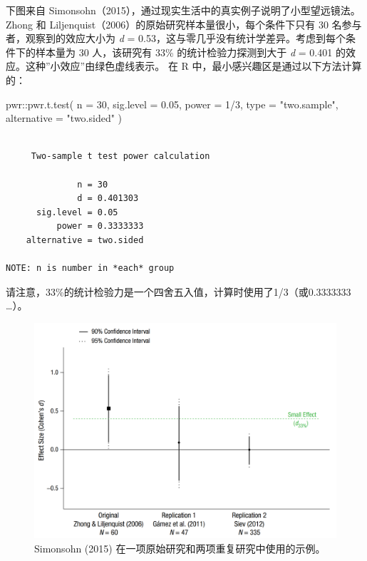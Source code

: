 \documentclass[
  letterpaper,
  DIV=11,
  numbers=noendperiod]{scrreprt}
\newenvironment{Shaded}{\begin{snugshade}}{\end{snugshade}}
\newcommand{\AttributeTok}[1]{\textcolor[rgb]{0.40,0.45,0.13}{#1}}
\newcommand{\DecValTok}[1]{\textcolor[rgb]{0.68,0.00,0.00}{#1}}
\newcommand{\FloatTok}[1]{\textcolor[rgb]{0.68,0.00,0.00}{#1}}
\newcommand{\FunctionTok}[1]{\textcolor[rgb]{0.28,0.35,0.67}{#1}}
\newcommand{\NormalTok}[1]{\textcolor[rgb]{0.00,0.23,0.31}{#1}}
\newcommand{\SpecialCharTok}[1]{\textcolor[rgb]{0.37,0.37,0.37}{#1}}
\newcommand{\StringTok}[1]{\textcolor[rgb]{0.13,0.47,0.30}{#1}}
\begin{document}
下图来自 Simonsohn（2015），通过现实生活中的真实例子说明了小型望远镜法。
Zhong 和 Liljenquist（2006）的原始研究样本量很小，每个条件下只有 30
名参与者，观察到的效应大小为 \emph{d} =
0.53，这与零几乎没有统计学差异。考虑到每个条件下的样本量为 30
人，该研究有 33\% 的统计检验力探测到大于 \emph{d} = 0.401
的效应。这种''小效应''由绿色虚线表示。 在 R
中，最小感兴趣区是通过以下方法计算的：

\begin{Shaded}
\begin{Highlighting}[]
\NormalTok{pwr}\SpecialCharTok{::}\FunctionTok{pwr.t.test}\NormalTok{(}
  \AttributeTok{n =} \DecValTok{30}\NormalTok{, }
  \AttributeTok{sig.level =} \FloatTok{0.05}\NormalTok{, }
  \AttributeTok{power =} \DecValTok{1}\SpecialCharTok{/}\DecValTok{3}\NormalTok{, }
  \AttributeTok{type =} \StringTok{"two.sample"}\NormalTok{,}
  \AttributeTok{alternative =} \StringTok{"two.sided"}
\NormalTok{)}
\end{Highlighting}
\end{Shaded}

\begin{verbatim}

     Two-sample t test power calculation 

              n = 30
              d = 0.401303
      sig.level = 0.05
          power = 0.3333333
    alternative = two.sided

NOTE: n is number in *each* group
\end{verbatim}

请注意，33\%的统计检验力是一个四舍五入值，计算时使用了1/3（或0.3333333
\ldots）。

\begin{figure}

{\centering \includegraphics[width=1\textwidth,height=\textheight]{images/a4aa20a6e2dadfbaa82bc614d40693c7.png}

}

\caption{\label{fig-simonsohnexample}Simonsohn (2015)
在一项原始研究和两项重复研究中使用的示例。}

\end{figure}
\end{document}
